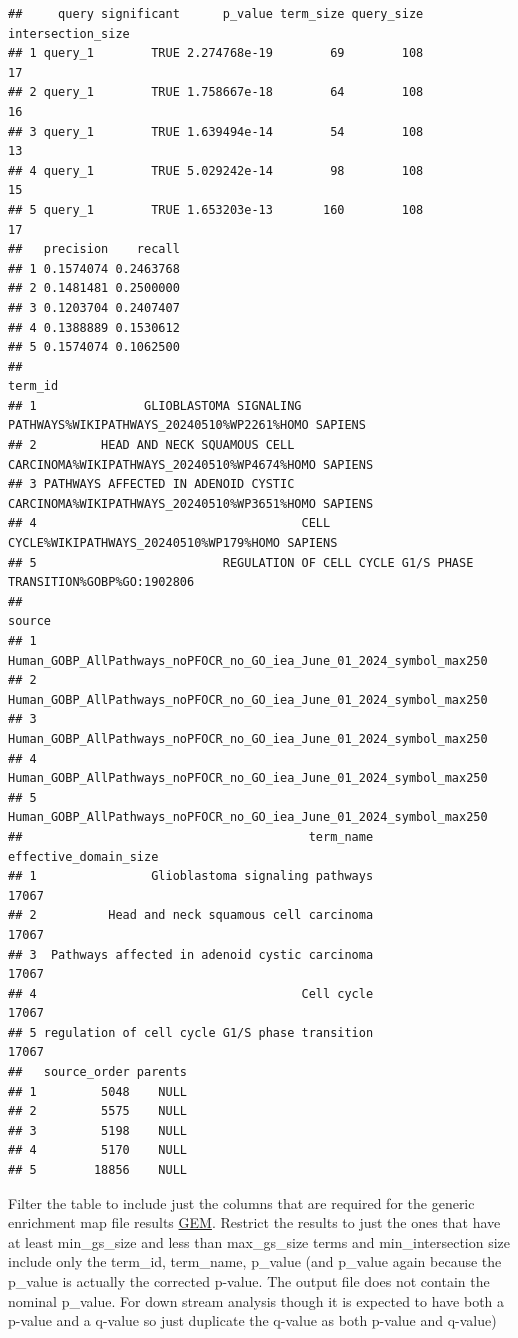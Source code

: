 \documentclass[
]{book}
\begin{document}
\begin{verbatim}
##     query significant      p_value term_size query_size intersection_size
## 1 query_1        TRUE 2.274768e-19        69        108                17
## 2 query_1        TRUE 1.758667e-18        64        108                16
## 3 query_1        TRUE 1.639494e-14        54        108                13
## 4 query_1        TRUE 5.029242e-14        98        108                15
## 5 query_1        TRUE 1.653203e-13       160        108                17
##   precision    recall
## 1 0.1574074 0.2463768
## 2 0.1481481 0.2500000
## 3 0.1203704 0.2407407
## 4 0.1388889 0.1530612
## 5 0.1574074 0.1062500
##                                                                                   term_id
## 1               GLIOBLASTOMA SIGNALING PATHWAYS%WIKIPATHWAYS_20240510%WP2261%HOMO SAPIENS
## 2         HEAD AND NECK SQUAMOUS CELL CARCINOMA%WIKIPATHWAYS_20240510%WP4674%HOMO SAPIENS
## 3 PATHWAYS AFFECTED IN ADENOID CYSTIC CARCINOMA%WIKIPATHWAYS_20240510%WP3651%HOMO SAPIENS
## 4                                     CELL CYCLE%WIKIPATHWAYS_20240510%WP179%HOMO SAPIENS
## 5                          REGULATION OF CELL CYCLE G1/S PHASE TRANSITION%GOBP%GO:1902806
##                                                                source
## 1 Human_GOBP_AllPathways_noPFOCR_no_GO_iea_June_01_2024_symbol_max250
## 2 Human_GOBP_AllPathways_noPFOCR_no_GO_iea_June_01_2024_symbol_max250
## 3 Human_GOBP_AllPathways_noPFOCR_no_GO_iea_June_01_2024_symbol_max250
## 4 Human_GOBP_AllPathways_noPFOCR_no_GO_iea_June_01_2024_symbol_max250
## 5 Human_GOBP_AllPathways_noPFOCR_no_GO_iea_June_01_2024_symbol_max250
##                                        term_name effective_domain_size
## 1                Glioblastoma signaling pathways                 17067
## 2          Head and neck squamous cell carcinoma                 17067
## 3  Pathways affected in adenoid cystic carcinoma                 17067
## 4                                     Cell cycle                 17067
## 5 regulation of cell cycle G1/S phase transition                 17067
##   source_order parents
## 1         5048    NULL
## 2         5575    NULL
## 3         5198    NULL
## 4         5170    NULL
## 5        18856    NULL
\end{verbatim}

Filter the table to include just the columns that are required for the generic enrichment map file results \href{https://enrichmentmap.readthedocs.io/en/latest/FileFormats.html\#generic-results-files}{GEM}. Restrict the results to just the ones that have at least min\_gs\_size and less than max\_gs\_size terms and min\_intersection size include only the term\_id, term\_name, p\_value (and p\_value again because the p\_value is actually the corrected p-value. The output file does not contain the nominal p\_value. For down stream analysis though it is expected to have both a p-value and a q-value so just duplicate the q-value as both p-value and q-value)
\end{document}
